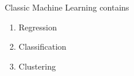 Classic Machine Learning contains 

\begin{enumerate}
    \item Regression
    \item Classification
    \item Clustering
\end{enumerate}


